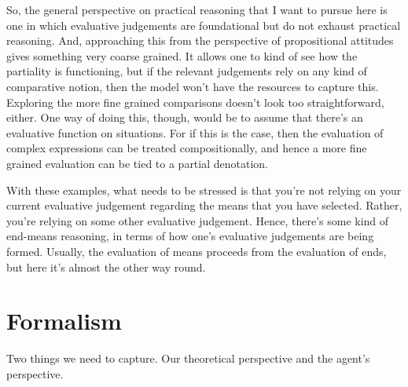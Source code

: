 \documentclass[10pt]{article}
\begin{document}
So, the general perspective on practical reasoning that I want to pursue here is one in which evaluative judgements are foundational but do not exhaust practical reasoning.
And, approaching this from the perspective of propositional attitudes gives something very coarse grained.
It allows one to kind of see how the partiality is functioning, but if the relevant judgements rely on any kind of comparative notion, then the model won't have the resources to capture this.
Exploring the more fine grained comparisons doesn't look too straightforward, either.
One way of doing this, though, would be to assume that there's an evaluative function on situations.
For if this is the case, then the evaluation of complex expressions can be treated compositionally, and hence a more fine grained evaluation can be tied to a partial denotation.

With these examples, what needs to be stressed is that you're not relying on your current evaluative judgement regarding the means that you have selected.
Rather, you're relying on some other evaluative judgement.
Hence, there's some kind of end-means reasoning, in terms of how one's evaluative judgements are being formed.
Usually, the evaluation of means proceeds from the evaluation of ends, but here it's almost the other way round.





\newpage

\section{Formalism}
\label{sec:formalism}

Two things we need to capture.
Our theoretical perspective and the agent's perspective.
\end{document}
